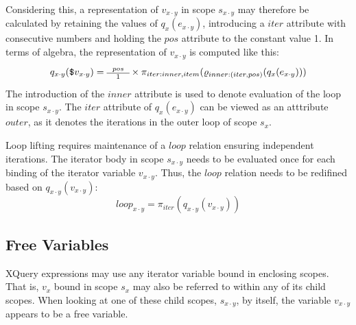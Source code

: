 Considering this, a representation of $v_{x \cdot y}$ in scope $s_{x \cdot y}$ may therefore be calculated by
retaining the values of $q_{x}(e_{x \cdot y})$, introducing a $iter$ attribute with consecutive numbers and
holding the $pos$ attribute to the constant value 1. In terms of algebra, the representation of $v_{x \cdot y}$ is
computed like this:
\begin{equation}
q_{x \cdot y}(\mbox{\texttt{\$}}v_{x \cdot y}) = \mbox{\scriptsize \begin{tabular}{c} $pos$ \\\hline 1
\end{tabular}} \times \pi_{iter:inner,item}(\varrho_{inner:(iter,pos)}(q_{x}(e_{x \cdot y})))
\label{eq:ll:qx_vxy}
\end{equation}
The introduction of the $inner$ attribute is used to denote evaluation of the loop in scope $s_{x \cdot y}$. The
$iter$ attribute of $q_{x}(e_{x \cdot y})$ can be viewed as an atttribute $outer$, as it denotes the iterations in
the outer loop of scope $s_{x}$.

Loop lifting requires maintenance of a $loop$ relation ensuring independent iterations. The iterator body in
scope $s_{x \cdot y}$ needs to be evaluated once for each binding of the iterator variable $v_{x \cdot y}$.
Thus, the $loop$ relation needs to be redifined based on $q_{x \cdot y}(v_{x \cdot y})$:
\begin{equation}
loop_{x \cdot y} = \pi_{iter}(q_{x \cdot y}(v_{x \cdot y}))
\label{eq:ll:loopx}
\end{equation}


\subsection{Free Variables}
\label{sect:translation:ll:freeVar}

XQuery expressions may use any iterator variable bound in enclosing scopes. That is, $v_{x}$ bound in
scope $s_{x}$ may also be referred to within any of its child scopes. When looking at one of these child scopes,
$s_{x \cdot y}$, by itself, the variable $v_{x \cdot y}$ appears to be a free variable.

